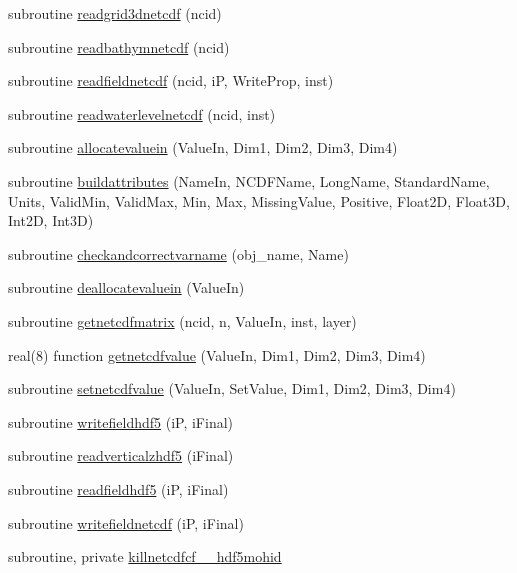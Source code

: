 \begin{DoxyCompactItemize}
\item 
subroutine \mbox{\hyperlink{namespacemodulenetcdfcf__2__hdf5mohid_a6fedd55132323077153e16ddf06c3fc1}{readgrid3dnetcdf}} (ncid)
\item 
subroutine \mbox{\hyperlink{namespacemodulenetcdfcf__2__hdf5mohid_af7f83fb951c020a987c7376d899f56e1}{readbathymnetcdf}} (ncid)
\item 
subroutine \mbox{\hyperlink{namespacemodulenetcdfcf__2__hdf5mohid_ac66f8e687cb8a5fe1cb48f9f02300915}{readfieldnetcdf}} (ncid, iP, Write\+Prop, inst)
\item 
subroutine \mbox{\hyperlink{namespacemodulenetcdfcf__2__hdf5mohid_a09c9e8d6a98c36d9bf0fe0c733ded2ce}{readwaterlevelnetcdf}} (ncid, inst)
\item 
subroutine \mbox{\hyperlink{namespacemodulenetcdfcf__2__hdf5mohid_af854968676c4e6f1d5d76e704087ae86}{allocatevaluein}} (Value\+In, Dim1, Dim2, Dim3, Dim4)
\item 
subroutine \mbox{\hyperlink{namespacemodulenetcdfcf__2__hdf5mohid_a9dbafb9898bd3f5184bc0e6cd96e5fbc}{buildattributes}} (Name\+In, N\+C\+D\+F\+Name, Long\+Name, Standard\+Name, Units, Valid\+Min, Valid\+Max, Min, Max, Missing\+Value, Positive, Float2D, Float3D, Int2D, Int3D)
\item 
subroutine \mbox{\hyperlink{namespacemodulenetcdfcf__2__hdf5mohid_ac0196286655bc4a08fbda809ca8d39e9}{checkandcorrectvarname}} (obj\+\_\+name, Name)
\item 
subroutine \mbox{\hyperlink{namespacemodulenetcdfcf__2__hdf5mohid_a270019f12c3ed995eab2d0a7dcb103cc}{deallocatevaluein}} (Value\+In)
\item 
subroutine \mbox{\hyperlink{namespacemodulenetcdfcf__2__hdf5mohid_a788802bec9e3806cfd877eb5bf6d2fef}{getnetcdfmatrix}} (ncid, n, Value\+In, inst, layer)
\item 
real(8) function \mbox{\hyperlink{namespacemodulenetcdfcf__2__hdf5mohid_a8bdc7928ff8c39c76b2c5fda4b90f2c5}{getnetcdfvalue}} (Value\+In, Dim1, Dim2, Dim3, Dim4)
\item 
subroutine \mbox{\hyperlink{namespacemodulenetcdfcf__2__hdf5mohid_a0a54d00603078be80ce02d8fb4b8a827}{setnetcdfvalue}} (Value\+In, Set\+Value, Dim1, Dim2, Dim3, Dim4)
\item 
subroutine \mbox{\hyperlink{namespacemodulenetcdfcf__2__hdf5mohid_a9a0ad1eb97650a07ad08d1d3d20271ad}{writefieldhdf5}} (iP, i\+Final)
\item 
subroutine \mbox{\hyperlink{namespacemodulenetcdfcf__2__hdf5mohid_a5ea0bf1216f1cdc72e51ebf22b85884e}{readverticalzhdf5}} (i\+Final)
\item 
subroutine \mbox{\hyperlink{namespacemodulenetcdfcf__2__hdf5mohid_af3d93c43025a8ea4bfc12e430d456ac3}{readfieldhdf5}} (iP, i\+Final)
\item 
subroutine \mbox{\hyperlink{namespacemodulenetcdfcf__2__hdf5mohid_ab5904631b48441b51fae172f8cfe49f4}{writefieldnetcdf}} (iP, i\+Final)
\item 
subroutine, private \mbox{\hyperlink{namespacemodulenetcdfcf__2__hdf5mohid_abe222a22b3453e9024edf051cf78ade8}{killnetcdfcf\+\_\+\_\+hdf5mohid}}
\end{DoxyCompactItemize}
